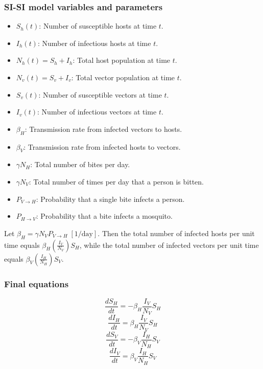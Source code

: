 \subsubsection{SI-SI model variables and parameters}
\begin{itemize}
    \item $S_h(t)$: Number of susceptible hosts at time $t$.
    \item $I_h(t)$: Number of infectious hosts at time $t$.
    \item $N_h(t) = S_h + I_h$: Total host population at time $t$.
    \item $N_v(t) = S_v + I_v$: Total vector population at time $t$.
    \item $S_v(t)$: Number of susceptible vectors at time $t$.
    \item $I_v(t)$: Number of infectious vectors at time $t$.
    \item $\beta_H$: Transmission rate from infected vectors to hosts.
    \item $\beta_V$: Transmission rate from infected hosts to vectors.
    \item $\gamma N_H$: Total number of bites per day. 
    \item $\gamma N_V$: Total number of times per day that a person is bitten. 
    \item $P_{V \to H}$: Probability that a single bite infects a person.
    \item $P_{H \to V}$: Probability that a bite infects a mosquito.
\end{itemize}
Let $\beta_H = \gamma N_V P_{V \to H} \; [\text{1/day}]$. Then the total number of infected hosts per unit time equals $\beta_H \left( \frac{I_V}{N_V} \right) S_H$, while the total number of infected vectors per unit time equals $\beta_V \left( \frac{I_H}{N_H} \right) S_V$.
\subsubsection{Final equations}
\begin{equation}
\frac{dS_H}{dt} = -\beta_{H} \frac{I_V}{N_V} S_H
\end{equation}
\begin{equation}
\frac{dI_H}{dt} = \beta_{H} \frac{I_V}{N_V} S_H
\end{equation}
\begin{equation}
\frac{dS_V}{dt} = -\beta_{V} \frac{I_H}{N_H} S_V
\end{equation}
\begin{equation}
\frac{dI_V}{dt} = \beta_{V} \frac{I_H}{N_H} S_V
\end{equation}
